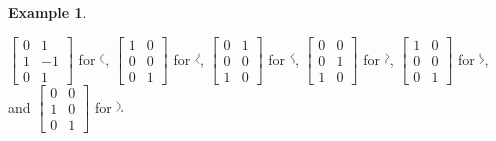 \documentclass[12pt]{amsart}
\numberwithin{equation}{section}
\theoremstyle{definition}
\newtheorem{example}[theorem]{Example}
\begin{document}
\begin{example}
\begin{center}
$\left[\begin{smallmatrix} 0 & 1 \\ 1 & -1 \\ 0 &
1 \end{smallmatrix}\right]$ for $\begin{tikzpicture} \draw (0,0) --
(-0.08,0.08) -- (-0.08,0.16) -- (0,0.24); \end{tikzpicture}$,
$\left[\begin{smallmatrix}  1 & 0 \\ 0 & 0 \\ 0 &
1 \end{smallmatrix}\right]$ for $\begin{tikzpicture} \draw (0,0) --
(-0.08,0.08) -- (0,0.16) -- (0,0.24); \end{tikzpicture}$,
$\left[\begin{smallmatrix} 0 & 1 \\ 0 & 0 \\ 1 &
0 \end{smallmatrix}\right]$ for $\begin{tikzpicture} \draw (0,0) --
(0,0.08) -- (-0.08,0.16) -- (0,0.24); \end{tikzpicture}$,
$\left[\begin{smallmatrix} 0 & 0 \\ 0 & 1 \\ 1 &
0 \end{smallmatrix}\right]$ for $\begin{tikzpicture} \draw (0,0) --
(0,0.08) -- (0.08,0.16) -- (0,0.24); \end{tikzpicture}$,
$\left[\begin{smallmatrix} 1 & 0 \\ 0 & 0 \\ 0 &
1 \end{smallmatrix}\right]$ for $\begin{tikzpicture} \draw (0,0) --
(0.08,0.08) -- (0,0.16) -- (0,0.24); \end{tikzpicture}$, and
$\left[\begin{smallmatrix} 0 & 0 \\ 1 & 0 \\ 0 &
1 \end{smallmatrix}\right]$ for $\begin{tikzpicture} \draw (0,0) --
(0.08,0.08) -- (0.08,0.16) -- (0,0.24); \end{tikzpicture}.$
\end{center}
\end{example}
\end{document}
